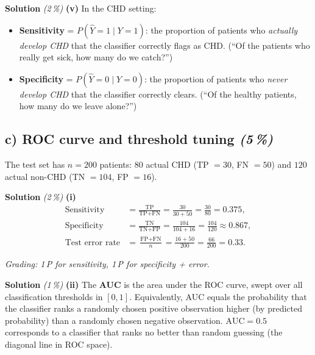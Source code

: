 \documentclass[11pt,a4paper]{article}
\newcommand{\subpoints}[1]{\textit{(#1\,\%)}}
\newcommand{\sol}{\noindent\textbf{Solution}}
\begin{document}
\medskip
\sol{} \subpoints{2} \textbf{(v)} In the CHD setting:
\begin{itemize}
  \item \textbf{Sensitivity} = $P(\hat Y = 1 \mid Y = 1)$: the proportion of patients who \emph{actually
        develop CHD} that the classifier correctly flags as CHD. (``Of the patients who really get sick,
        how many do we catch?'')
  \item \textbf{Specificity} = $P(\hat Y = 0 \mid Y = 0)$: the proportion of patients who \emph{never
        develop CHD} that the classifier correctly clears. (``Of the healthy patients, how many do we
        leave alone?'')
\end{itemize}

\subsection*{c) ROC curve and threshold tuning \subpoints{5}}

The test set has $n=200$ patients: $80$ actual CHD (TP $=30$, FN $=50$) and $120$ actual non-CHD
(TN $=104$, FP $=16$).

\medskip
\sol{} \subpoints{2} \textbf{(i)}
\begin{align*}
\text{Sensitivity} &= \frac{\text{TP}}{\text{TP}+\text{FN}}
   = \frac{30}{30+50} = \frac{30}{80} = \boxed{0.375}, \\[3pt]
\text{Specificity} &= \frac{\text{TN}}{\text{TN}+\text{FP}}
   = \frac{104}{104+16} = \frac{104}{120} \approx \boxed{0.867}, \\[3pt]
\text{Test error rate} &= \frac{\text{FP}+\text{FN}}{n}
   = \frac{16+50}{200} = \frac{66}{200} = \boxed{0.33}.
\end{align*}

\noindent\emph{Grading: 1\,P for sensitivity, 1\,P for specificity + error.}

\medskip
\sol{} \subpoints{1} \textbf{(ii)} The \textbf{AUC} is the area under the ROC curve, swept over all
classification thresholds in $[0,1]$. Equivalently, AUC equals the probability that the classifier ranks
a randomly chosen positive observation higher (by predicted probability) than a randomly chosen negative
observation. $\boxed{\mathrm{AUC}=0.5}$ corresponds to a classifier that ranks no better than random
guessing (the diagonal line in ROC space).
\end{document}
